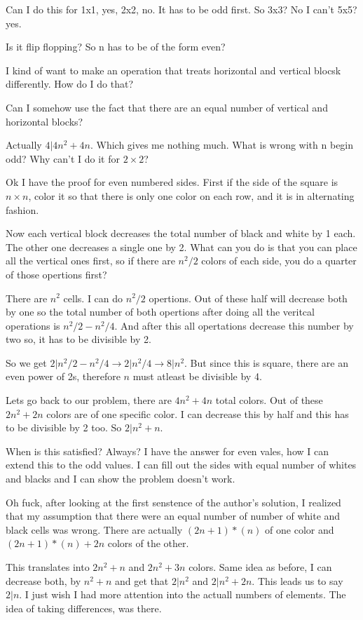 \documentclass{article}
\begin{document}
Can I do this for 1x1, yes, 2x2, no. It has to be odd first.
So 3x3? No I can't 
5x5? yes.

Is it flip flopping? So n has to be of the form even?

I kind of want to make an operation that treats horizontal and vertical blocsk differently.
How do I do that? 

Can I somehow use the fact that there are an equal number of vertical and horizontal blocks?


Actually $4\vert 4n^2+4n$. Which gives me nothing much. What is wrong with n begin odd?
Why can't I do it for $2\times 2$?

Ok I have the proof for even numbered sides. First if the side of the square is
$n\times n$, color it so that there is only one color on each row, and it is in alternating fashion.

Now each vertical block decreases the total number of black and white by 1 each. 
The other one decreases a single one by 2. What can you do is that you can place all the 
vertical ones first, so if there are $n^2/2$ colors of each side, you do a quarter of those opertions first?

There are $n^2$ cells. I can do $n^2/2$ opertions. Out of these half will decrease both by one
so the total number of both opertions after doing all the veritcal operations is 
$n^2/2 - n^2/4$. And after this all opertations decrease this number by two so, it has to be divisible by 2.

So we get $2\vert n^2/2-n^2/4 \rightarrow  2\vert n^2/4 \rightarrow 8\vert n^2$. But since this is square,
there are an even power of 2s, therefore $n$ must atleast be divisible by 4.

Lets go back to our problem, there are $4n^2+4n$ total colors. Out of these $2n^2+2n$ colors are of one specific color.
I can decrease this by half and this has to be divisible by 2 too. So $2\vert n^2+n$. 

When is this satisfied? Always? I have the answer for even vales, how I can extend this to the odd values.
I can fill out the sides with equal number of whites and blacks and I can show 
the problem doesn't work.

Oh fuck, after looking at the first senstence of the author's solution, I realized 
that my assumption that there were an equal number of number of white and black cells was wrong. 
There are actually $(2n+1)*(n)$ of one color and $(2n+1)*(n)+2n$ colors of  the other.

This translates into $2n^2+n$ and $2n^2+3n$ colors. Same idea as before, I can decrease both, by
$n^2+n$ and get that $2\vert n^2$ and $2\vert n^2+2n$. This leads us to say $2\vert n$. I just wish I 
had more attention into the actuall numbers of elements. The idea of taking differences, was there.
\end{document}
